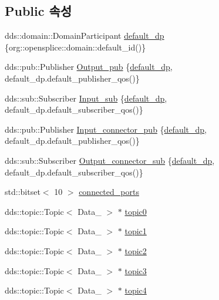 \subsection*{Public 속성}
\begin{DoxyCompactItemize}
\item 
dds\+::domain\+::\+Domain\+Participant \hyperlink{classFactory_a7e8eac562d69cbed38ee27137c860498}{default\+\_\+dp} \{org\+::opensplice\+::domain\+::default\+\_\+id()\}
\item 
dds\+::pub\+::\+Publisher \hyperlink{classFactory_a6a48290339d13731e356940e7d29db00}{Output\+\_\+pub} \{\hyperlink{classFactory_a7e8eac562d69cbed38ee27137c860498}{default\+\_\+dp}, default\+\_\+dp.\+default\+\_\+publisher\+\_\+qos()\}
\item 
dds\+::sub\+::\+Subscriber \hyperlink{classFactory_a1c96bbf37ab7ad1775854d283298212a}{Input\+\_\+sub} \{\hyperlink{classFactory_a7e8eac562d69cbed38ee27137c860498}{default\+\_\+dp}, default\+\_\+dp.\+default\+\_\+subscriber\+\_\+qos()\}
\item 
dds\+::pub\+::\+Publisher \hyperlink{classFactory_a0fa1e401cba8537d6aff6a5b1ef34637}{Input\+\_\+connector\+\_\+pub} \{\hyperlink{classFactory_a7e8eac562d69cbed38ee27137c860498}{default\+\_\+dp}, default\+\_\+dp.\+default\+\_\+publisher\+\_\+qos()\}
\item 
dds\+::sub\+::\+Subscriber \hyperlink{classFactory_a2b0fe17e9fe543b0dc41c3898293ae3e}{Output\+\_\+connector\+\_\+sub} \{\hyperlink{classFactory_a7e8eac562d69cbed38ee27137c860498}{default\+\_\+dp}, default\+\_\+dp.\+default\+\_\+subscriber\+\_\+qos()\}
\item 
std\+::bitset$<$ 10 $>$ \hyperlink{classFactory_a47d1a95acef574eae4410faf891130df}{connected\+\_\+ports}
\item 
dds\+::topic\+::\+Topic$<$ Data\+\_ $>$ $\ast$ \hyperlink{classFactory_a575dfe382a4cbf779aa8b141fb38f2c4}{topic0}
\item 
dds\+::topic\+::\+Topic$<$ Data\+\_ $>$ $\ast$ \hyperlink{classFactory_a0dfe2257a4968511148b107030387e25}{topic1}
\item 
dds\+::topic\+::\+Topic$<$ Data\+\_ $>$ $\ast$ \hyperlink{classFactory_ab9a453fcd33f6843819c86ffa569a46a}{topic2}
\item 
dds\+::topic\+::\+Topic$<$ Data\+\_ $>$ $\ast$ \hyperlink{classFactory_a54fef646f78840de831f09c0f4f065c9}{topic3}
\item 
dds\+::topic\+::\+Topic$<$ Data\+\_ $>$ $\ast$ \hyperlink{classFactory_a9621c03dc6ffd5d7c1b73c66f37cae7c}{topic4}

\end{DoxyCompactItemize}

